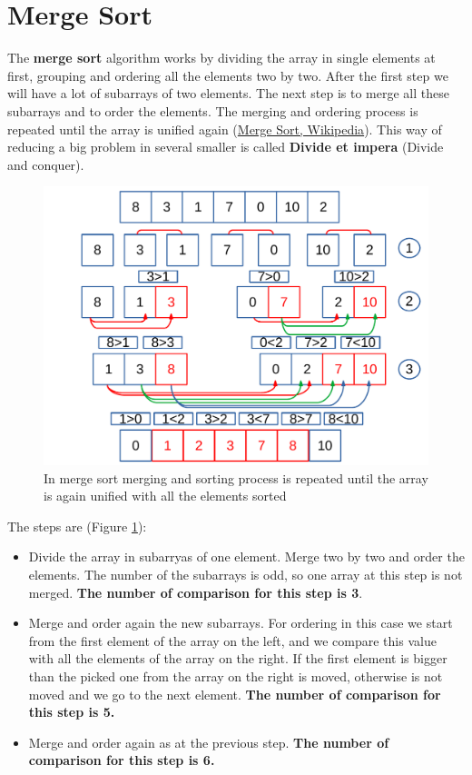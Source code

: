 \section{Merge Sort}
The \textbf{merge sort} algorithm works by dividing the array in single elements at first, grouping and ordering all the elements two by two. After the first step we will have a lot of subarrays of two elements. The next step is to merge all these subarrays and to order the elements. The merging and ordering process is repeated until the array is unified again \cite{wikimergesort} (\href{https://en.wikipedia.org/wiki/Merge_sort}{Merge Sort, Wikipedia}).  This way of reducing a big problem in several smaller is called \textbf{Divide et impera} (Divide and conquer).

\begin{figure}[H]
	\begin{center}
		\includegraphics[scale=.52]{chapters/searchandsorting/images/sorting_6.pdf}
		\caption[Merge sort algorithm]{In merge sort merging and sorting process is repeated until the array is again unified with all the elements sorted}
		\label{sorting_6}
	\end{center}
\end{figure}

The steps are (Figure \ref{sorting_6}): 
\begin{itemize}
\item[1] Divide the array in subarryas of one element. Merge two by two and order the elements. The number of the subarrays is odd, so one array at this step is not merged. \textbf{The number of comparison for this step is 3}.
\item[2] Merge and order again the new subarrays. For ordering in this case we start from the first element of the array on the left, and we compare this value with all the elements of the array on the right. If the first element is bigger than the picked one from the array on the right is moved, otherwise is not moved and we go to the next element. \textbf{The number of comparison for this step is 5.}   
\item[3] Merge and order again as at the previous step. \textbf{The number of comparison for this step is 6.}
\end{itemize}

